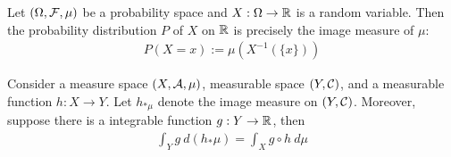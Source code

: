 \documentclass[11pt]{article}
\numberwithin{equation}{section}
\begin{document}
    \begin{example}
        Let $(\Omega, \mathcal{{F}}, \mu)$ be a probability space and $X: \Omega \to \mathbb{R}$ is a random variable. Then the probability distribution $P$ of $X$ on $\mathbb{R}$ is precisely the image measure of $\mu$:
        \begin{align}
            P(X = x) := \mu(X^{-1}(\{x\}))
        \end{align}
    \end{example}

    \begin{theorem}
        Consider a measure space $(X, \mathcal{{A}}, \mu)$, measurable space $(Y, \mathcal{{C}})$, and a measurable function $h: X \to Y$.
        Let $h_{*\mu}$ denote the image measure on $(Y, \mathcal{{C}})$.
        Moreover, suppose there is a integrable function $g: Y \to \mathbb{R}$, then
        \begin{align}
            \int_Y g\ d(h_*\mu) = \int_X g\circ h\ d\mu
        \end{align}
    \end{theorem}
    
\end{document}
